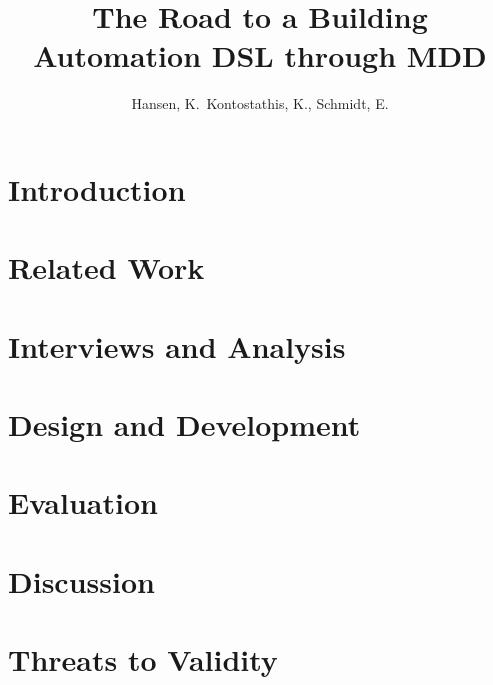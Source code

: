 \documentclass{"The Road to a Building Automation DSL through MDD"}
\begin{document}
\pagestyle{headings}
\title{The Road to a Building Automation DSL through MDD}
\author{Hansen, K.\, Kontostathis, K., Schmidt, E.}
\maketitle

\vspace{-0.3cm}



\vspace{-0.5cm}

\section{Introduction}\label{sec:introduction}


\section{Related Work}\label{sec:relatedwork}


\section{Interviews and Analysis}\label{sec:interviewsAndAnalysis}


\section{Design and Development}\label{sec:designAndDevelopment} 


\section{Evaluation}\label{sec:evaluation} 

 
\section{Discussion}\label{sec:discussion}


\section{Threats to Validity}\label{sec:threatsToValidity}

\end{document}
